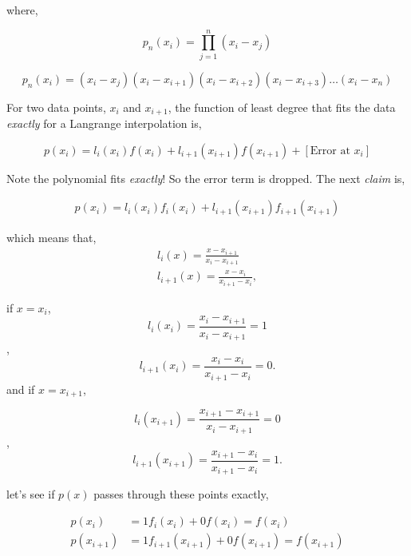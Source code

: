 \documentclass[12pt]{article}
\begin{document}
where,

\begin{equation*}
    p_n(x_i) = \prod_{j = 1}^{n} \left( x_i - x_j \right) 
\end{equation*}

\begin{equation*}
    p_n(x_i) =  \left( x_{i} - x_{j} \right) 
    \left( x_i - x_{i+1} \right)
    \left( x_i - x_{i+2} \right)
    \left( x_i - x_{i+3} \right) \dots
    ( x_i - x_n)
\end{equation*}

For two data points, $x_i$ and $x_{i+1}$, the function of least degree
that fits the data \textit{exactly} for a Langrange interpolation is,

\begin{equation*}
    p(x_i) = l_{i}(x_i)f(x_{i}) + l_{i+1}(x_{i+1})f(x_{i+1}) + \left[\text{
        Error at $x_i$}
    \right]
\end{equation*}

Note the polynomial fits  \textit{exactly}! So the error term is dropped.
The next \textit{claim} is,

\begin{align*}
    p(x_i) =  
    l_i\left( x_i\right)f_i\left( x_i\right) + 
    l_{i+1}\left( x_{i+1}\right)f_{i+1}\left( x_{i+1}\right) 
\end{align*}

which means that,
\begin{align*}
    l_i(x) = \frac{x - x_{i+1}}{x_{i} - x_{i+1}} \\
    l_{i+1}(x) = \frac{x - x_{i}}{x_{i+1} - x_{i}},
\end{align*}

if $x = x_i$,
\[ l_i(x_i) = \frac{x_i - x_{i+1}}{x_i - x_{i+1} }= 1\], 
\[l_{i + 1}(x_i) = \frac{x_i-x_i}{x_{i+1} - x_{i}} = 0.\]
and 
if $x = x_{i+1}$,

\[ l_i(x_{i+1}) = \frac{x_{i+1} - x_{i+1}}{x_i - x_{i+1} }= 0\], 
\[l_{i + 1}(x_{i+1}) = \frac{x_{i+1}-x_i}{x_{i+1} - x_{i}} = 1.\]

let's see if $p\left( x \right)$ passes through these points exactly,

\begin{align*}
    p\left( x_i \right) &= 1 f_i(x_i) + 0 f\left( x_i  \right) =  f\left( x_i  \right) \\
    p\left( x_{i+1} \right) &= 1 f_{i+1}(x_{i+1}) + 0 f\left( x_{i+1}  \right) =  f\left( x_{i+1}  \right) 
\end{align*}
\end{document}
